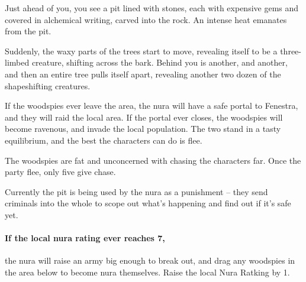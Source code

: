 \begin{multicols}{2}
\begin{boxtext}

  Just ahead of you, you see a pit lined with stones, each with expensive gems and covered in alchemical writing, carved into the rock.
  An intense heat emanates from the pit.

  Suddenly, the waxy parts of the trees start to move, revealing itself to be a three-limbed creature, shifting across the bark.  Behind you is another, and another, and then an entire tree pulls itself apart, revealing another two dozen of the shapeshifting creatures.

\end{boxtext}

If the woodspies ever leave the area, the nura will have a safe portal to Fenestra, and they will raid the local area.
If the portal ever closes, the woodspies will become ravenous, and invade the local population.
The two stand in a tasty equilibrium, and the best the characters can do is flee.

The woodspies are fat and unconcerned with chasing the characters far.  Once the party flee, only five give chase.


Currently the pit is being used by the nura as a punishment -- they send criminals into the whole to scope out what's happening and find out if it's safe yet.

\paragraph{If the local nura rating ever reaches 7,}
the nura will raise an army big enough to break out, and drag any woodspies in the area below to become nura themselves.
Raise the local Nura Ratking by 1.


\stopcontents[sq]

\end{multicols}

\stopcontents[Forest]

